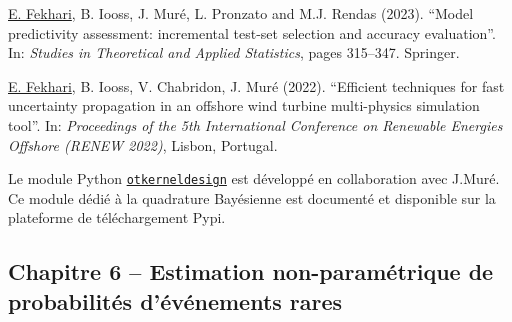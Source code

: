 \medskip
\noindent
{} \underline{E. Fekhari}, B. Iooss, J. Mur\'{e}, L. Pronzato and M.J. Rendas (2023). ``Model predictivity assessment: incremental test-set selection and accuracy evaluation''. In: \textit{Studies in Theoretical and Applied Statistics}, pages 315--347. Springer.

\medskip
\noindent
{} \underline{E. Fekhari}, B. Iooss, V. Chabridon, J. Mur\'{e} (2022). ``Efficient techniques for fast uncertainty propagation in an offshore wind turbine multi-physics simulation tool''. In: \textit{Proceedings of the 5th International Conference on Renewable Energies Offshore (RENEW 2022)}, Lisbon, Portugal.

\medskip
\noindent
{} Le module Python \href{https://efekhari27.github.io/otkerneldesign/master/}{\texttt{otkerneldesign}} est d\'{e}velopp\'{e} en collaboration avec J.Mur\'{e}. Ce module d\'{e}di\'{e} à la quadrature Bay\'{e}sienne est document\'{e} et disponible sur la plateforme de t\'{e}l\'{e}chargement Pypi. 


\subsection*{Chapitre 6 -- Estimation non-param\'{e}trique de probabilit\'{e}s d'\'{e}v\'{e}nements rares}

